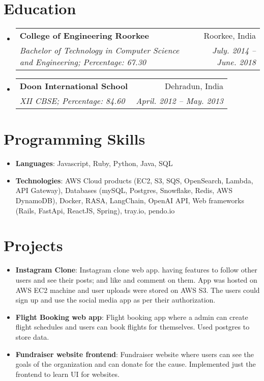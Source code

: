 \documentclass[a4paper,11pt]{article}
\makeatletter
\newcommand{\resumeItem}[2]{
  \item\small{
    \textbf{#1}{: #2 \vspace{-2pt}}
  }
}
\newcommand{\resumeSubheading}[4]{
  \vspace{-1pt}\item
    \begin{tabular*}{0.97\textwidth}[t]{l@{\extracolsep{\fill}}r}
      \textbf{#1} & #2 \\
      \textit{\small#3} & \textit{\small #4} \\
    \end{tabular*}\vspace{-5pt}
}
\newcommand{\resumeSubSubheading}[2]{
  \begin{tabular*}{0.97\textwidth}{l@{\extracolsep{\fill}}r}
    \textit{\small#1} & \textit{\small #2} \\
  \end{tabular*}\vspace{-5pt}
}
\newcommand{\resumeSubItem}[2]{\resumeItem{#1}{#2}\vspace{-4pt}}
\newcommand{\resumeSubHeadingListStart}{\begin{itemize}[leftmargin=*]}
\newcommand{\resumeSubHeadingListEnd}{\end{itemize}}
\newcommand{\resumeItemListStart}{\begin{itemize}}
\newcommand{\resumeItemListEnd}{\end{itemize}\vspace{-5pt}}
\makeatother
\begin{document}





\section{Education}
  \resumeSubHeadingListStart
    \resumeSubheading
      {College of Engineering Roorkee}{Roorkee, India}
      {Bachelor of Technology in Computer Science and Engineering;  Percentage: 67.30}{July. 2014 -- June. 2018}
    \resumeSubheading
      {Doon International School}{Dehradun, India}
      {XII CBSE;  Percentage: 84.60}{April. 2012 -- May. 2013}
  \resumeSubHeadingListEnd





\section{Programming Skills}
  \resumeItemListStart
    \resumeItem{Languages}
      {Javascript, Ruby, Python, Java, SQL}
    \resumeItem{Technologies}
      {AWS Cloud products (EC2, S3, SQS, OpenSearch, Lambda, API Gateway), Databases (mySQL, Postgres, Snowflake, Redis, AWS DynamoDB), Docker, RASA, LangChain, OpenAI API, Web frameworks (Rails, FastApi, ReactJS, Spring), tray.io, pendo.io}
  \resumeItemListEnd





\section{Projects}
  \resumeSubHeadingListStart
    \resumeSubItem{Instagram Clone}
      {Instagram clone web app. having features to follow other users and see their posts; and like and comment on them. App was hosted on AWS EC2 machine and user uploads were stored on AWS S3. The users could sign up and use the social media app as per their authorization.}
    \resumeSubItem{Flight Booking web app}
      {Flight booking app where a admin can create flight schedules and users can book flights for themselves. Used postgres to store data.}
    \resumeSubItem{Fundraiser website frontend}
      {Fundraiser website where users can see the goals of the organization and can donate for the cause. Implemented just the frontend to learn UI for websites.}
  \resumeSubHeadingListEnd





\end{document}
